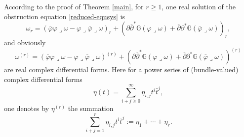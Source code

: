 \documentclass[12pt]{amsart}
\numberwithin{equation}{section}
\renewcommand{\1}{\mathds{1}}
\newcommand{\G}{\mathbb{G}}
\newcommand{\db}{\overline{\partial}}
\renewcommand{\>}{\rightarrow}
\newcommand{\p}{\partial}
\def\p{\partial}
\def\b{\bar}
\def\l{\lrcorner}
\begin{document}
According to the proof of Theorem \ref{main}, for $r\geq 1$, one
real solution of the obstruction equation \eqref{reduced-equsys} is
\begin{equation}\label{sol-reduced-equsys}
\omega_r=(\b{\varphi}\varphi\l\omega-\varphi\l\b{\varphi}\l\omega)_r+\left(\p\db^*\G(\varphi\l\omega)+\db\p^*\G(\b{\varphi}\l\omega)\right)_{r},
\end{equation}
and obviously
\begin{equation}
\label{sol-reduced-equsys-r}
\omega^{(r)}=(\b{\varphi}\varphi\l\omega-\varphi\l\b{\varphi}\l\omega)^{(r)}+\left(\p\db^*\G(\varphi\l\omega)+\db\p^*\G(\b{\varphi}\l\omega)\right)^{(r)}
\end{equation}
are real complex differential forms. Here for a power series of (bundle-valued)
complex differential forms
$$\eta(t)=\sum_{i+j\geq 0}^\infty \eta_{i,j} t^i\bar{t}^j,$$ one
denotes by $\eta^{(r)}$ the summation
$$\sum_{i+j=1}^{r}
\eta_{i,j} t^i\bar{t}^j:=\eta_1+\cdots+\eta_r.$$
\end{document}
